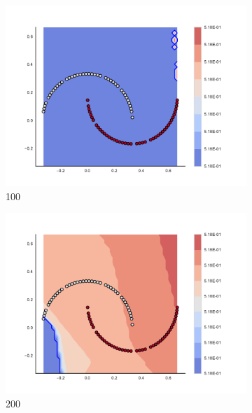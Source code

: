         \begin{figure}[h]\ContinuedFloat
        
\begin{subfigure}[b]{0.09\textwidth}
    \includegraphics[clip, trim=2.35cm 1.75cm 4.5cm 0cm,width=\textwidth]{img/convergence/100.pdf}
    \caption{100}
    \label{fig:convergence_100}
\end{subfigure}
%
\begin{subfigure}[b]{0.09\textwidth}
    \includegraphics[clip, trim=2.35cm 1.75cm 4.5cm 0cm,width=\textwidth]{img/convergence/200.pdf}
    \caption{200}
    \label{fig:convergence_200}
\end{subfigure}
%
\begin{subfigure}[b]{0.09\textwidth}

\end{subfigure}
\end{figure}
